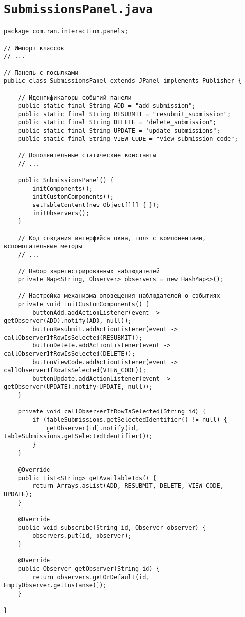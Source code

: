 \section*{\texttt{SubmissionsPanel.java}}
\begin{verbatim}
package com.ran.interaction.panels;

// Импорт классов
// ...

// Панель с посылками
public class SubmissionsPanel extends JPanel implements Publisher {

    // Идентификаторы событий панели
    public static final String ADD = "add_submission";
    public static final String RESUBMIT = "resubmit_submission";
    public static final String DELETE = "delete_submission";
    public static final String UPDATE = "update_submissions";
    public static final String VIEW_CODE = "view_submission_code";
    
    // Дополнительные статические константы
    // ...
    
    public SubmissionsPanel() {
        initComponents();
        initCustomComponents();
        setTableContent(new Object[][] { });
        initObservers();
    }

    // Код создания интерфейса окна, поля с компонентами, вспомогательные методы
    // ...                    

    // Набор зарегистрированных наблюдателей
    private Map<String, Observer> observers = new HashMap<>();
    
    // Настройка механизма оповещения наблюдателей о событиях
    private void initCustomComponents() {
        buttonAdd.addActionListener(event -> getObserver(ADD).notify(ADD, null));
        buttonResubmit.addActionListener(event -> callObserverIfRowIsSelected(RESUBMIT));
        buttonDelete.addActionListener(event -> callObserverIfRowIsSelected(DELETE));
        buttonViewCode.addActionListener(event -> callObserverIfRowIsSelected(VIEW_CODE));
        buttonUpdate.addActionListener(event -> getObserver(UPDATE).notify(UPDATE, null));
    }
    
    private void callObserverIfRowIsSelected(String id) {
        if (tableSubmissions.getSelectedIdentifier() != null) {
            getObserver(id).notify(id, tableSubmissions.getSelectedIdentifier());
        }
    }
    
    @Override
    public List<String> getAvailableIds() {
        return Arrays.asList(ADD, RESUBMIT, DELETE, VIEW_CODE, UPDATE);
    }
    
    @Override
    public void subscribe(String id, Observer observer) {
        observers.put(id, observer);
    }

    @Override
    public Observer getObserver(String id) {
        return observers.getOrDefault(id, EmptyObserver.getInstanse());
    }
    
}
\end{verbatim}

